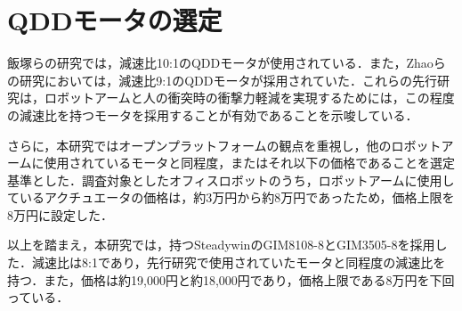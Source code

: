 \section{QDDモータの選定}
飯塚ら\cite{飯塚浩太2021}の研究では，減速比10:1のQDDモータが使用されている．また，Zhaoら\cite{10106520}の研究においては，減速比9:1のQDDモータが採用されていた．これらの先行研究は，ロボットアームと人の衝突時の衝撃力軽減を実現するためには，この程度の減速比を持つモータを採用することが有効であることを示唆している．

さらに，本研究ではオープンプラットフォームの観点を重視し，他のロボットアームに使用されているモータと同程度，またはそれ以下の価格であることを選定基準とした．調査対象としたオフィスロボットのうち，ロボットアームに使用しているアクチュエータの価格は，約3万円から約8万円であったため，価格上限を8万円に設定した．

以上を踏まえ，本研究では，持つSteadywinのGIM8108-8とGIM3505-8を採用した．減速比は8:1であり，先行研究で使用されていたモータと同程度の減速比を持つ．また，価格は約19,000円と約18,000円であり，価格上限である8万円を下回っている．
